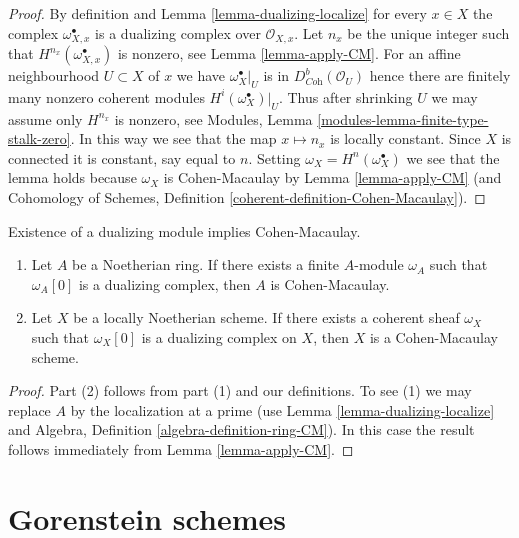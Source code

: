 \begin{proof}
By definition and Lemma \ref{lemma-dualizing-localize} for every $x \in X$
the complex $\omega_{X, x}^\bullet$ is a dualizing complex over
$\mathcal{O}_{X, x}$. Let $n_x$ be the unique integer such that
$H^{n_{x}}(\omega_{X, x}^\bullet)$ is nonzero, see
Lemma \ref{lemma-apply-CM}. For an affine neighbourhood $U \subset X$
of $x$ we have $\omega_X^\bullet|_U$ is in $D^b_{\textit{Coh}}(\mathcal{O}_U)$
hence there are finitely many nonzero coherent modules
$H^i(\omega_X^\bullet)|_U$. Thus after shrinking $U$ we may assume
only $H^{n_x}$ is nonzero, see
Modules, Lemma \ref{modules-lemma-finite-type-stalk-zero}.
In this way we see that the map $x \mapsto n_x$ is locally constant.
Since $X$ is connected it is constant, say equal to $n$.
Setting $\omega_X = H^n(\omega_X^\bullet)$ we see that the lemma
holds because $\omega_X$ is Cohen-Macaulay by
Lemma \ref{lemma-apply-CM}
(and Cohomology of Schemes, Definition
\ref{coherent-definition-Cohen-Macaulay}).
\end{proof}

\begin{lemma}
\label{lemma-has-dualizing-module-CM-scheme}
Existence of a dualizing module implies Cohen-Macaulay.
\begin{enumerate}
\item Let $A$ be a Noetherian ring. If there exists a finite $A$-module
$\omega_A$ such that $\omega_A[0]$ is a dualizing complex, then
$A$ is Cohen-Macaulay.
\item Let $X$ be a locally Noetherian scheme. If there exists a coherent sheaf
$\omega_X$ such that $\omega_X[0]$ is a dualizing complex on $X$, then
$X$ is a Cohen-Macaulay scheme.
\end{enumerate}
\end{lemma}

\begin{proof}
Part (2) follows from part (1) and our definitions.
To see (1) we may replace $A$ by the localization at a prime
(use Lemma \ref{lemma-dualizing-localize} and
Algebra, Definition \ref{algebra-definition-ring-CM}).
In this case the result follows immediately from
Lemma \ref{lemma-apply-CM}.
\end{proof}






\section{Gorenstein schemes}
\label{section-gorenstein}

